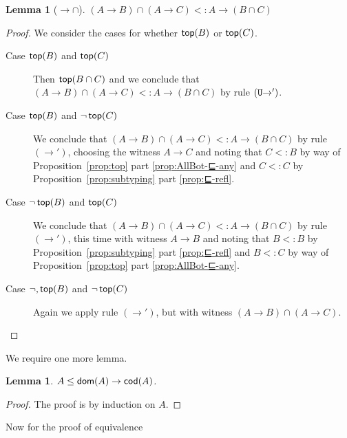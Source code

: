 \documentclass{article}
\newtheorem{lemma}[theorem]{Lemma}
\begin{document}
\begin{lemma}[${\to}{\cap}$]\label{lem:⊑-dist}
  $(A \to B) \cap (A \to C) <: A \to (B \cap C)$
\end{lemma}
\begin{proof}
   We consider the cases for whether $\mathsf{top}(B)$ or $\mathsf{top}(C)$.
   \begin{description}
   \item[Case $\mathsf{top}(B)$ and $\mathsf{top}(C)$]
     Then $\mathsf{top}(B \cap C)$ and we conclude that
     $(A \to B) \cap (A \to C) <: A \to (B \cap C)$
     by rule $(\mathtt{U}{\to}')$.
   \item[Case $\mathsf{top}(B)$ and $\neg\,\mathsf{top}(C)$]
     We conclude that 
     $(A \to B) \cap (A \to C) <: A \to (B \cap C)$
     by rule $(\to')$, choosing the witness $A \to C$
     and noting that $C <: B$ 
     by way of Proposition~\ref{prop:top}
     part \ref{prop:AllBot-⊑-any}
     and $C <: C$ by Proposition~\ref{prop:subtyping}
     part \ref{prop:⊑-refl}.
   \item[Case $\neg\,\mathsf{top}(B)$ and $\mathsf{top}(C)$]
     We conclude that 
     $(A \to B) \cap (A \to C) <: A \to (B \cap C)$
     by rule $(\to')$, this time with witness $A \to B$
     and noting that
     $B <: B$ by Proposition~\ref{prop:subtyping}
     part \ref{prop:⊑-refl}
     and $B <: C$ 
     by way of Proposition~\ref{prop:top}
     part \ref{prop:AllBot-⊑-any}.
   \item[Case $\neg,\mathsf{top}(B)$ and $\neg\,\mathsf{top}(C)$]
     Again we apply rule $(\to')$, but with witness
     $(A \to B) \cap (A \to C)$.
   \end{description}
\end{proof}

\noindent We require one more lemma.

\begin{lemma}
  \label{lem:dv↦cv<:v}
  $A \leq \mathsf{dom}(A) \to \mathsf{cod}(A)$.
\end{lemma}
\begin{proof}
  The proof is by induction on $A$.
\end{proof}

\noindent Now for the proof of equivalence
\end{document}

